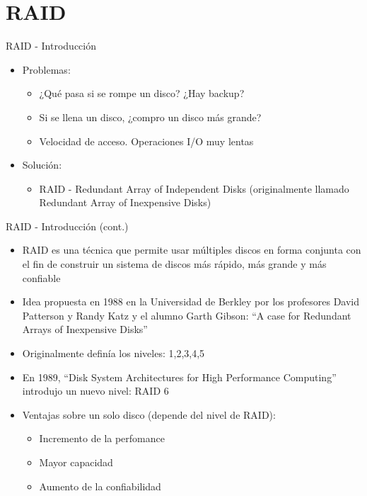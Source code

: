 \section{RAID}

\begin{frame}{RAID - Introducción}
  \begin{itemize}
   \item Problemas:
   \vspace{0.1cm}
   \begin{itemize}
    \item ¿Qué pasa si se rompe un disco? ¿Hay backup?
    \vspace{0.1cm}
    \item Si se llena un disco, ¿compro un disco más grande?
    \vspace{0.1cm}
    \item Velocidad de acceso. Operaciones I/O muy lentas
   \end{itemize}
   \vspace{0.2cm}
   \item Solución: 
   \begin{itemize}
    \vspace{0.1cm}
    \item RAID - Redundant Array of Independent Disks (originalmente llamado Redundant Array of Inexpensive Disks)
   \end{itemize}
 \end{itemize}
\end{frame}

\begin{frame}{RAID - Introducción (cont.)}
  \begin{itemize}
   \item RAID es una técnica que permite usar múltiples discos en forma conjunta con el fin de construir un sistema de discos 
      más rápido, más grande y más confiable
   \item Idea propuesta en 1988 en la Universidad de Berkley por los profesores David Patterson y Randy Katz y el 
      alumno Garth Gibson: ``A case for Redundant Arrays of Inexpensive Disks''
   \item Originalmente definía los niveles: 1,2,3,4,5
   \item En 1989, ``Disk System Architectures for High Performance Computing'' introdujo un nuevo nivel: RAID 6
   \item Ventajas sobre un solo disco (depende del nivel de RAID):
   \begin{itemize}
    \item Incremento de la perfomance
    \item Mayor capacidad
    \item Aumento de la confiabilidad
   \end{itemize}
  \end{itemize}
\end{frame}

